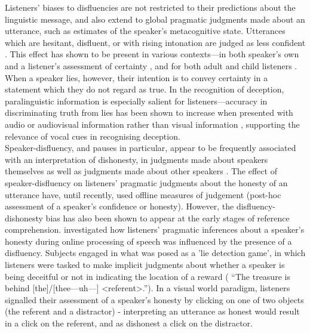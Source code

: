 \documentclass[man]{apa6}
\begin{document}


Listeners' biases to disfluencies are not restricted to their predictions about the linguistic message, and also extend to global pragmatic judgments made about an utterance, such as estimates of the speaker's metacognitive state.
Utterances which are hesitant, disfluent, or with rising intonation are judged as less confident \citep{Smith1993, Brennan1995}.
This effect has shown to be present in various contexts---in both speaker's own and a listener's assessment of certainty \citep{Swerts2005}, and for both adult and child listeners \citep{Krahmer2005}.
When a speaker lies, however, their intention is to convey certainty in a statement which they do not regard as true. 
In the recognition of deception, paralinguistic information is especially salient for listeners---accuracy in discriminating truth from lies has been shown to increase when presented with audio or audiovisual information rather than visual information \citep{Bond2006}, supporting the relevance of vocal cues in recognising deception.\\

Speaker-disfluency, and pauses in particular, appear to be frequently associated with an interpretation of dishonesty, in judgments made about speakers themselves as well as judgments made about other speakers \citep{Zuckerman1981}. 
The effect of speaker-disfluency on listeners' pragmatic judgments about the honesty of an utterance have, until recently, used offline measures of judgement (post-hoc assessment of a speaker's confidence or honesty). 
However, the disfluency-dishonesty bias has also been shown to appear at the early stages of reference comprehension. 
\citet{Loy2016} investigated how listeners' pragmatic inferences about a speaker's honesty during online processing of speech was influenced by the presence of a disfluency. 
Subjects engaged in what was posed as a 'lie detection game', in which listeners were tasked to make implicit judgments about whether a speaker is being deceitful or not in indicating the location of a reward ( ``The treasure is behind [the]/[thee---uh---] \textless referent\textgreater .''). 
In a visual world paradigm, listeners signalled their assessment of a speaker's honesty by clicking on one of two objects (the referent and a distractor) - interpreting an utterance as honest would result in a click on the referent, and as dishonest a click on the distractor.\\
\end{document}

